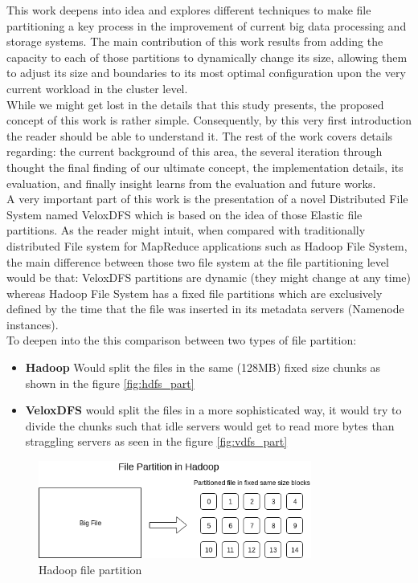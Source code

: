 This work deepens into idea and explores different techniques to make
file partitioning a key process in the improvement of current big data
processing and storage systems. The main contribution of this work results from
adding the capacity to each of those partitions to dynamically change its size,
allowing them to adjust its size and boundaries to its most optimal
configuration upon the very current workload in the cluster level.  \\

While we might get lost in the details that this study presents, the proposed
concept of this work is rather simple. Consequently, by this very first
introduction the reader should be able to understand it. The rest of the work
covers details regarding: the current background of this area, the several
iteration through thought the final finding of our ultimate concept, the
implementation details, its evaluation, and finally insight learns from the
evaluation and future works.  \\

A very important part of this work is the presentation of a novel Distributed
File System named VeloxDFS which is based on the idea of those Elastic file
partitions. As the reader might intuit, when compared with traditionally
distributed File system for MapReduce applications such as Hadoop File System,
the main difference between those two file system at the file partitioning level
would be that: VeloxDFS partitions are dynamic (they might change at any time)
whereas Hadoop File System has a fixed file partitions which are exclusively
defined by the time that the file was inserted in its metadata servers (Namenode
instances).  \\

To deepen into the this comparison between two types of file partition:
\begin{itemize}
    \item \textbf{Hadoop} Would split the files in the same (128MB) fixed size chunks
          as shown in the figure \ref{fig:hdfs_part}
          
    \item \textbf{VeloxDFS} would split the files in a more sophisticated way, it would try
        to divide the chunks such that idle servers would get to read more bytes than straggling servers
        as seen in the figure \ref{fig:vdfs_part}
\end{itemize}


\label{fig:hdfs_part}
\begin{figure}[H]
    \centering
    \includegraphics[width=0.8\textwidth]{figures/hadoop_partition.png}
    \caption{Hadoop file partition}
\end{figure}

